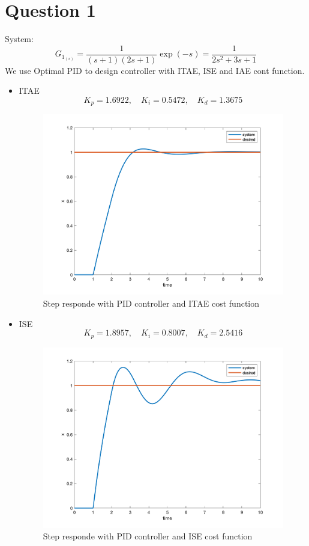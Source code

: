\section{Question 1}
System:
$$
G_{1_{(s)}} = \dfrac{1}{(s+1)(2s+1)}\exp(-s) = \dfrac{1}{2s^2+3s+1}
$$
We use Optimal PID to design controller with ITAE, ISE and IAE cont function.
\newpage
 \begin{itemize}
     \item ITAE
     $$
     K_p = 1.6922, \quad K_i = 0.5472, \quad K_d = 1.3675
     $$
     \begin{figure}[H]
        \caption{Step responde with PID controller and ITAE cost function}
        \centering
        \includegraphics[width=11cm]{../Figure/Q1/ITAE.png}
    \end{figure}
    \item ISE
    $$
    K_p =1.8957, \quad K_i = 0.8007, \quad  K_d =2.5416
    $$
    \begin{figure}[H]
       \caption{Step responde with PID controller and ISE cost function}
       \centering
       \includegraphics[width=11cm]{../Figure/Q1/ISE.png}

\end{figure}
\end{itemize}
